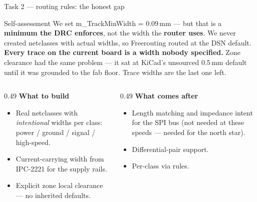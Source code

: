 \documentclass[aspectratio=169,10pt]{beamer}
\newcommand{\code}[1]{{\ttfamily\small #1}}
\begin{document}
\begin{frame}{Task 2 --- routing rules: the honest gap}
\vspace{2mm}
\begin{block}{Self-assessment}
\small
We set \code{m\_TrackMinWidth = 0.09\,mm} --- but that is a \textbf{minimum the DRC enforces}, not the width the \textbf{router uses}.
We never created netclasses with actual widths, so Freerouting routed at the DSN default.\\[4pt]
\textbf{Every trace on the current board is a width nobody specified.} Zone clearance had the same problem --- it sat at KiCad's unsourced 0.5\,mm default until it was grounded to the fab floor. Trace widths are the last one left.
\end{block}
\vspace{2mm}
\begin{columns}[T]
\begin{column}{0.49\textwidth}
\textbf{What to build}
\begin{itemize}\small
  \item Real netclasses with \emph{intentional} widths per class: power / ground / signal / high-speed.
  \item Current-carrying width from IPC-2221 for the supply rails.
  \item Explicit zone local clearance --- no inherited defaults.
\end{itemize}
\end{column}
\begin{column}{0.49\textwidth}
\textbf{What comes after}
\begin{itemize}\small
  \item Length matching and impedance intent for the SPI bus (not needed at these speeds --- needed for the north star).
  \item Differential-pair support.
  \item Per-class via rules.
\end{itemize}
\end{column}
\end{columns}
\end{frame}
\end{document}
